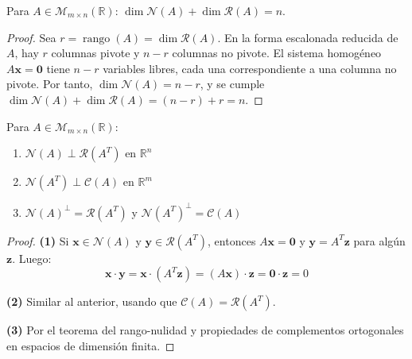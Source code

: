\begin{theorem}\label{thm:cap06:rango-nulidad}
Para $A \in \mathcal{M}_{m \times n}(\mathbb{R})$: $\dim \mathcal{N}(A) + \dim \mathcal{R}(A) = n.$
\begin{proof}
Sea $r = \operatorname{rango}(A) = \dim \mathcal{R}(A)$. En la forma escalonada reducida de $A$, hay $r$ columnas pivote y $n-r$ columnas no pivote. El sistema homogéneo $A\mathbf{x} = \mathbf{0}$ tiene $n-r$ variables libres, cada una correspondiente a una columna no pivote. Por tanto, $\dim \mathcal{N}(A) = n-r$, y se cumple $\dim \mathcal{N}(A) + \dim \mathcal{R}(A) = (n-r) + r = n$.
\end{proof}
\end{theorem}

\begin{theorem}
Para $A \in \mathcal{M}_{m \times n}(\mathbb{R})$:
\begin{enumerate}
\item $\mathcal{N}(A) \perp \mathcal{R}(A^T)$ en $\mathbb{R}^n$
\item $\mathcal{N}(A^T) \perp \mathcal{C}(A)$ en $\mathbb{R}^m$
\item $\mathcal{N}(A)^\perp = \mathcal{R}(A^T)$ y $\mathcal{N}(A^T)^\perp = \mathcal{C}(A)$
\end{enumerate}
\begin{proof}
\textbf{(1)} Si $\mathbf{x} \in \mathcal{N}(A)$ y $\mathbf{y} \in \mathcal{R}(A^T)$, entonces $A\mathbf{x} = \mathbf{0}$ y $\mathbf{y} = A^T\mathbf{z}$ para algún $\mathbf{z}$. Luego:
$$\mathbf{x} \cdot \mathbf{y} = \mathbf{x} \cdot (A^T\mathbf{z}) = (A\mathbf{x}) \cdot \mathbf{z} = \mathbf{0} \cdot \mathbf{z} = 0$$

\textbf{(2)} Similar al anterior, usando que $\mathcal{C}(A) = \mathcal{R}(A^T)$.

\textbf{(3)} Por el teorema del rango-nulidad y propiedades de complementos ortogonales en espacios de dimensión finita.
\end{proof}
\end{theorem}

